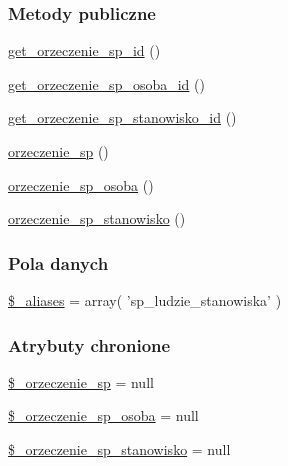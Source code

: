 \subsubsection*{Metody publiczne}
\begin{DoxyCompactItemize}
\item 
\hyperlink{classep___orzeczenie__sp__osoba__stanowisko_a98a84a7375b3d05cb4516bbb2c7f3e04}{get\-\_\-orzeczenie\-\_\-sp\-\_\-id} ()
\item 
\hyperlink{classep___orzeczenie__sp__osoba__stanowisko_a35caef412ddaa0a4fde201dd8a68d34c}{get\-\_\-orzeczenie\-\_\-sp\-\_\-osoba\-\_\-id} ()
\item 
\hyperlink{classep___orzeczenie__sp__osoba__stanowisko_a0f20c2e82e4ea518b53a7bdca333d9ec}{get\-\_\-orzeczenie\-\_\-sp\-\_\-stanowisko\-\_\-id} ()
\item 
\hyperlink{classep___orzeczenie__sp__osoba__stanowisko_a498c7b61096c1bcb941e93a8d1385318}{orzeczenie\-\_\-sp} ()
\item 
\hyperlink{classep___orzeczenie__sp__osoba__stanowisko_a104627da416bbb3f34f3de3cc273cc3e}{orzeczenie\-\_\-sp\-\_\-osoba} ()
\item 
\hyperlink{classep___orzeczenie__sp__osoba__stanowisko_a161a70d3faff50c13d35616bdf233ce6}{orzeczenie\-\_\-sp\-\_\-stanowisko} ()
\end{DoxyCompactItemize}
\subsubsection*{Pola danych}
\begin{DoxyCompactItemize}
\item 
\hyperlink{classep___orzeczenie__sp__osoba__stanowisko_ab4e31d75f0bc5d512456911e5d01366b}{\$\-\_\-aliases} = array( 'sp\-\_\-ludzie\-\_\-stanowiska' )
\end{DoxyCompactItemize}
\subsubsection*{Atrybuty chronione}
\begin{DoxyCompactItemize}
\item 
\hyperlink{classep___orzeczenie__sp__osoba__stanowisko_aa2e1ecb50e6fae26a854ac995f7226b8}{\$\-\_\-orzeczenie\-\_\-sp} = null
\item 
\hyperlink{classep___orzeczenie__sp__osoba__stanowisko_aa30d4201fc3a8b5a7765a48d49d5fce3}{\$\-\_\-orzeczenie\-\_\-sp\-\_\-osoba} = null
\item 
\hyperlink{classep___orzeczenie__sp__osoba__stanowisko_a40db8434e34a6782c8dbb2e847a99d40}{\$\-\_\-orzeczenie\-\_\-sp\-\_\-stanowisko} = null
\end{DoxyCompactItemize}
